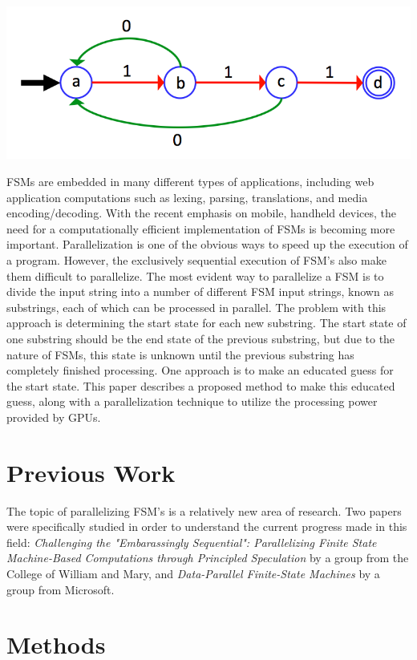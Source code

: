 \documentclass{sigplanconf}
\begin{document}
\includegraphics[width=\linewidth]{fsm_diagram.png}

FSMs are embedded in many different types of applications, including web application computations such as lexing, parsing, translations, and media encoding/decoding. With the recent emphasis on mobile, handheld devices, the need for a computationally efficient implementation of FSMs is becoming more important. Parallelization is one of the obvious ways to speed up the execution of a program. However, the exclusively sequential execution of FSM's also make them difficult to parallelize. The most evident way to parallelize a FSM is to divide the input string into a number of different FSM input strings, known as substrings, each of which can be processed in parallel. The problem with this approach is determining the start state for each new substring. The start state of one substring should be the end state of the previous substring, but due to the nature of FSMs, this state is unknown until the previous substring has completely finished processing. One approach is to make an educated guess for the start state. This paper describes a proposed method to make this educated guess, along with a parallelization technique to utilize the processing power provided by GPUs.

\section{Previous Work}
The topic of parallelizing FSM's is a relatively new area of research. Two papers were specifically studied in order to understand the current progress made in this field: \textit{Challenging the "Embarassingly Sequential": Parallelizing Finite State Machine-Based Computations through Principled Speculation} by a group from the College of William and Mary, and \textit{Data-Parallel Finite-State Machines} by a group from Microsoft.


\section{Methods}
\end{document}
